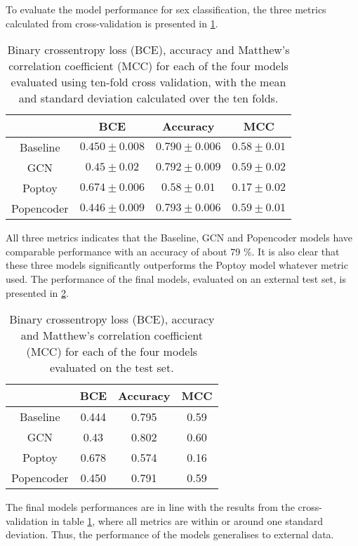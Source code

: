 To evaluate the model performance for sex classification, the three metrics calculated from cross-validation is presented in \ref{tab:sex_model_results}.
\begin{table}[H]
    \centering
    \caption{Binary crossentropy loss (BCE), accuracy and Matthew's correlation coefficient (MCC) for each of the four models evaluated using ten-fold cross validation, with the mean and standard deviation calculated over the ten folds.}    
    \begin{tabular}{c|c|c|c}
         & BCE & Accuracy & MCC\\ \hline
        Baseline & $0.450\pm0.008$ & $0.790\pm0.006$ &$0.58\pm 0.01$\\
        GCN &$0.45\pm0.02$ & $0.792\pm0.009$& $0.59\pm0.02$\\
        Poptoy &$0.674\pm 0.006$ & $0.58\pm0.01$ &$0.17\pm0.02$\\
        Popencoder &$0.446\pm0.009$& $0.793\pm 0.006$ & $0.59\pm0.01$\\
    \end{tabular}
    \label{tab:sex_model_results}
\end{table}
All three metrics indicates that the Baseline, GCN and Popencoder models have comparable performance with an accuracy of about 79 \%. It is also clear that these three models significantly outperforms the Poptoy model whatever metric used. The performance of the final models, evaluated on an external test set, is presented in \ref{tab:sex_final_model_results}.
\begin{table}[H]
    \centering
    \caption{Binary crossentropy loss (BCE), accuracy and Matthew's correlation coefficient (MCC) for each of the four models evaluated on the test set.}
    \begin{tabular}{c|c|c|c}
         & BCE & Accuracy & MCC\\ \hline
        Baseline & 0.444 & 0.795 &0.59\\
        GCN & 0.43& 0.802 & 0.60 \\
        Poptoy &0.678 &0.574 &0.16\\
        Popencoder & 0.450 & 0.791& 0.59\\
    \end{tabular}
    \label{tab:sex_final_model_results}
\end{table}
The final models performances are in line with the results from the cross-validation in table \ref{tab:sex_model_results}, where all metrics are within or around one standard deviation. Thus, the performance of the models generalises to external data.

